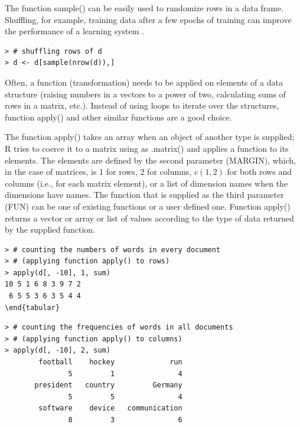 \documentclass[11pt,openany,executivepaper]{book}
\begin{document}
The function sample() can be easily used to randomize rows in a data frame. Shuffling, for example, training data after a few epochs of training can improve the performance of a learning system \cite{51}.

\begin{verbatim}
> # shuffling rows of d
> d <- d[sample(nrow(d)),]
\end{verbatim}

Often, a function (transformation) needs to be applied on elements of a data structure (raising numbers in a vectors to a power of two, calculating sums of rows in a matrix, etc.). Instead of using loops to iterate over the structures, function apply() and other similar functions are a good choice.

The function apply() takes an array when an object of another type is supplied; R tries to coerce it to a matrix using as .matrix() and applies a function to its elements. The elements are defined by the second parameter (MARGIN), which, in the case of matrices, is 1 for rows, 2 for columns, $\mathrm{c}(1,2)$ for both rows and columns (i.e., for each matrix element), or a list of dimension names when the dimensions have names. The function that is supplied as the third parameter (FUN) can be one of existing functions or a user defined one. Function apply() returns a vector or array or list of values according to the type of data returned by the supplied function.

\begin{verbatim}
> # counting the numbers of words in every document
> # (applying function apply() to rows)
> apply(d[, -10], 1, sum)
10 5 1 6 8 3 9 7 2
 6 5 5 3 6 3 5 4 4
\end{tabular}
\end{verbatim}

\begin{verbatim}
> # counting the frequencies of words in all documents
> # (applying function apply() to columns)
> apply(d[, -10], 2, sum)
        football    hockey             run
               5         1               4
       president   country         Germany
               5         5               4
        software    device   communication
               8         3               6
\end{verbatim}
\end{document}
